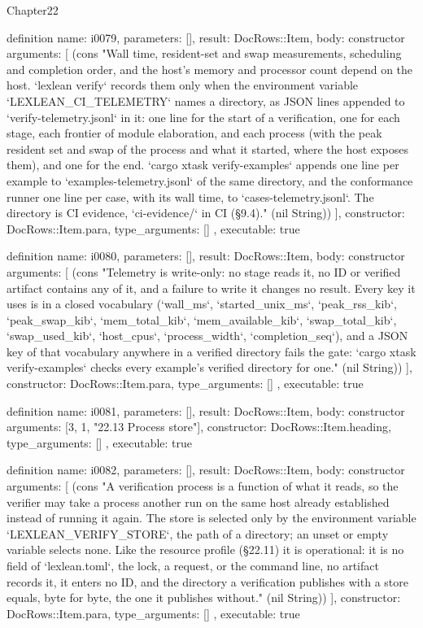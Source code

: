 \begin{lexlean}{Chapter22}
\begin{semanticmodule}
definition{
  name: i0079,
  parameters: [],
  result: DocRows::Item,
  body: constructor{
    arguments: [
      (cons "Wall time, resident-set and swap measurements, scheduling and completion order, and the host's memory and processor count depend on the host. `lexlean verify` records them only when the environment variable `LEXLEAN_CI_TELEMETRY` names a directory, as JSON lines appended to `verify-telemetry.jsonl` in it: one line for the start of a verification, one for each stage, each frontier of module elaboration, and each process (with the peak resident set and swap of the process and what it started, where the host exposes them), and one for the end. `cargo xtask verify-examples` appends one line per example to `examples-telemetry.jsonl` of the same directory, and the conformance runner one line per case, with its wall time, to `cases-telemetry.jsonl`. The directory is CI evidence, `ci-evidence/` in CI (§9.4)." (nil String))
    ],
    constructor: DocRows::Item.para,
    type_arguments: []
  },
  executable: true
}

definition{
  name: i0080,
  parameters: [],
  result: DocRows::Item,
  body: constructor{
    arguments: [
      (cons "Telemetry is write-only: no stage reads it, no ID or verified artifact contains any of it, and a failure to write it changes no result. Every key it uses is in a closed vocabulary (`wall_ms`, `started_unix_ms`, `peak_rss_kib`, `peak_swap_kib`, `mem_total_kib`, `mem_available_kib`, `swap_total_kib`, `swap_used_kib`, `host_cpus`, `process_width`, `completion_seq`), and a JSON key of that vocabulary anywhere in a verified directory fails the gate: `cargo xtask verify-examples` checks every example's verified directory for one." (nil String))
    ],
    constructor: DocRows::Item.para,
    type_arguments: []
  },
  executable: true
}

definition{
  name: i0081,
  parameters: [],
  result: DocRows::Item,
  body: constructor{
    arguments: [3, 1, "22.13 Process store"],
    constructor: DocRows::Item.heading,
    type_arguments: []
  },
  executable: true
}

definition{
  name: i0082,
  parameters: [],
  result: DocRows::Item,
  body: constructor{
    arguments: [
      (cons "A verification process is a function of what it reads, so the verifier may take a process another run on the same host already established instead of running it again. The store is selected only by the environment variable `LEXLEAN_VERIFY_STORE`, the path of a directory; an unset or empty variable selects none. Like the resource profile (§22.11) it is operational: it is no field of `lexlean.toml`, the lock, a request, or the command line, no artifact records it, it enters no ID, and the directory a verification publishes with a store equals, byte for byte, the one it publishes without." (nil String))
    ],
    constructor: DocRows::Item.para,
    type_arguments: []
  },
  executable: true
}


\end{semanticmodule}
\end{lexlean}
